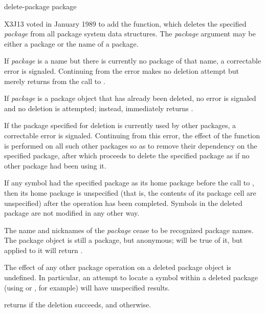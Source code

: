 \begin{new}
\begin{defun}[Function]
delete-package package

X3J13 voted in January 1989
to add the  function, which
deletes the specified \emph{package} from all package system data structures.
The \emph{package} argument may be either a package or the name of a package.

If \emph{package} is a name but there is currently no package of that name,
a correctable error is signaled.  Continuing from the error makes
no deletion attempt but merely returns  from the call to
.

If \emph{package} is a package object that has already been deleted,
no error is signaled and no deletion is attempted; instead,
 immediately returns .

If the package specified for deletion is currently used by other packages,
a correctable error is signaled.  Continuing from this error,
the effect of the function  is performed on all
such other packages so as to remove their dependency on the
specified package, after which  proceeds to
delete the specified package as if no other package had been using it.

If any symbol had the specified package as its home package before
the call to , then its home package is unspecified
(that is, the contents of its package cell are unspecified)
after the  operation has been completed.
Symbols in the deleted package are not modified in any other way.

The name and nicknames of the \emph{package} cease to be recognized package
names.  The package object is still a package, but anonymous;  will
be true of it, but  applied to it will return .

The effect of any other package operation on a deleted package object
is undefined.  In particular, an attempt to locate a symbol within a
deleted package (using  or , for example)
will have unspecified results.

 returns  if the deletion succeeds,
and  otherwise.
\end{defun}
\end{new}

